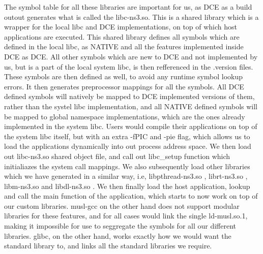 \documentclass{sig-alternate}
\begin{document}
The symbol table for all these libraries are important for us, as DCE as a build outout generates what is called the libc-ns3.so. This is a shared 
library which is a wrapper for the local libc and DCE implementations, on top of which host applications are executed. This shared library defines 
all symbols which are defined in the local libc, as NATIVE and all the features implemented inside DCE as DCE. All other symbols which are new to 
DCE and not implemented by us, but is a part of the local system libc, is then refferenced in the .version files. These symbols are then defined 
as well, to avoid any runtime symbol lookup errors. It then generates preprocessor mappings for all the symbols. All DCE defined symbols will 
natively be mapped to DCE implemented versions of them, rather than the systel libc implementation, and all NATIVE defined symbols will be mapped 
to global namespace implementations, which are the ones already implemented in the system libc. Users would compile their applications on top of 
the system libc itself, but with an extra -fPIC and -pie flag, which allows us to load the applications dynamically into out process address 
space. We then load out libc-ns3.so shared object file, and call out libc\_setup function which initialiazes the system call mappings. We also 
subsequently load other libraries which we have generated in a similar way, i.e, libpthread-ns3.so , librt-ns3.so , libm-ns3.so and libdl-ns3.so .
We then finally load the host application, lookup and call the main function of the application, which starts to now work on top of our custom 
libraries. musl-gcc on the other hand does not support modular libraries for these features, and for all cases would link the single ld-musl.so.1, making it 
impossible for use to seggregate the symbols for all our different libraries. glibc, on the other hand, works exactly how we would want the standard 
library to, and links all the standard libraries we require.
\end{document}
